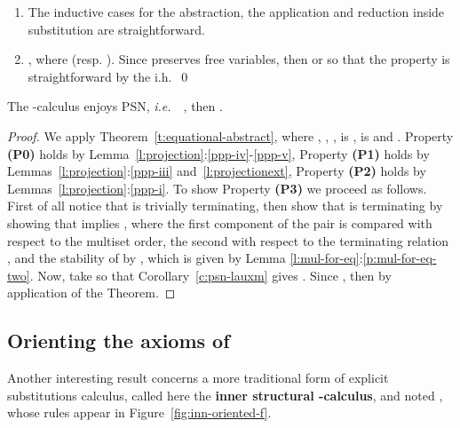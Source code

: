 \documentclass{LMCS}
\newcommand{\ie}{{\it  i.e.}~}
\renewcommand{\>}{\rightarrow}
\newcommand{\ih}{i.h.}
\newcommand{\deft}[1]{{\bf #1}}
\newcommand{\ignore}[1]{}
\begin{document}
\begin{enumerate}[]
\begin{enumerate}[]
           
\ignore{If  , 
Then we conclude by using the \ih\ and 
 Lemma~\ref{l:newu-pass-to-sub} if . }



     \end{enumerate}
\item The inductive cases for the  abstraction, the application 
      and reduction inside substitution are straightforward. 

\ignore{
\item , where  (resp. ).
        
        If , then:
         
       
        If , then:

          

}       

\item , where  (resp. ).
       Since  preserves free variables, then
   or  
so that the
  property is straightforward by the \ih\
\qed
\end{enumerate}




\begin{thm}
\label{t:psn-enriched}
The -calculus enjoys PSN, \ie\ , then .
\end{thm}

\begin{proof}
We apply Theorem~\ref{t:equational-abstract}, where ,
, ,
 is ,  is  and
. Property {\bf (P0)} holds by
Lemma~\ref{l:projection}:\ref{ppp-iv}-\ref{ppp-v}, Property {\bf (P1)}
holds by Lemmas~\ref{l:projection}:\ref{ppp-iii}
and~\ref{l:projectionext}, Property {\bf (P2)} holds by
Lemmas~\ref{l:projection}:\ref{ppp-i}. To show Property {\bf (P3)} we
proceed as follows. First of all notice that
 is trivially terminating, then show that
 is terminating by showing that  implies , where the first component of the pair is compared
with respect to the multiset order, the second with respect to the
terminating relation , and the
stability of  by , which is given by Lemma
\ref{l:mul-for-eq}:\ref{p:mul-for-eq-two}.  Now, take  so that Corollary~\ref{c:psn-lauxm}
  gives . Since , then  by application of the
  Theorem. 
\end{proof}


\subsection{Orienting the axioms of }

Another interesting result concerns a more
traditional form of explicit substitutions calculus, called here the 
\deft{inner structural -calculus},  and noted ,  whose rules appear in Figure~\ref{fig:inn-oriented-f}.
\end{document}
